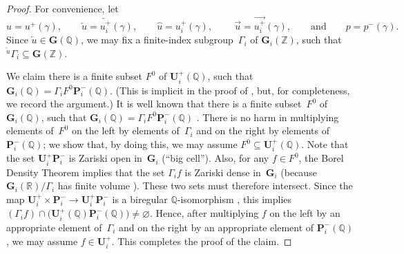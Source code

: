 \documentclass[pdftex]{sigma}
\newcommand{\QQ}{\mathbb{Q}}
\newcommand{\RR}{\mathbb{R}}
\newcommand{\ZZ}{\mathbb{Z}}
\newcommand{\Ga}{\mathbf{G}}
\newcommand{\Pa}{\mathbf{P}}
\newcommand{\Ua}{\mathbf{U}}
\newcommand{\ra}{\overrightarrow}
\newcommand{\la}{\overleftarrow}
\numberwithin{equation}{section}
\theoremstyle{definition}
\begin{document}
\begin{proof}For convenience, let
	\[ u = u^+(\gamma), \qquad \overleftarrow{u} = \la{u^+_i}(\gamma), \qquad \widehat{u} = u^+_i(\gamma), \ \qquad \overrightarrow{u} = \ra{u^+_i}(\gamma), \qquad \text{and}\qquad p = p^-(\gamma) .\]
Since $\overleftarrow{u} \in \Ga(\QQ)$, we may fix a finite-index subgroup~$\Gamma_i$ of $\Ga_i(\ZZ)$, such that ${}^{\overleftarrow{u}}\Gamma_i \subseteq \Ga(\ZZ)$.

We claim there is a finite subset $F^0$ of $\Ua^+_i(\QQ)$, such that $\Ga_i(\QQ) = \Gamma_i F^0 \Pa_i^-(\QQ)$. (This is implicit in the proof of \cite[Lemma~4.19]{MR1828742}, but, for completeness, we record the argument.) It is well known that there is a finite subset~$F^0$ of $\Ga_i(\QQ)$, such that $\Ga_i(\QQ) = \Gamma_i F^0 \Pa_i^-(\QQ)$ \cite[Proposition~15.6]{MR0244260}. There is no harm in multiplying elements of~$F^0$ on the left by elements of~$\Gamma_i$ and on the right by elements of~$\Pa_i^-(\QQ)$; we show that, by doing this, we may assume $F^0 \subseteq \Ua^+_i(\QQ)$.
Note that the set $\Ua^+_i \Pa_i^-$ is Zariski open in~$\Ga_i$ (``big cell'').
Also, for any $f \in F^0$, the Borel Density Theorem \cite[Theorem~4.10, p.~205] {MR1278263} implies that the set $\Gamma_i f$ is Zariski dense in~$\Ga_i$ (because $\Ga_i(\RR)/\Gamma_i$ has finite volume \cite[Theorem~4.13, p.~213]{MR1278263}). These two sets must therefore intersect. Since the map $\Ua^+_i \times \Pa_i^- \to \Ua^+_i \Pa_i^-$ is a biregular $\QQ$-isomorphism \cite[Proposition~3.24, p.~84]{BorelTits-GrpRed}, this implies $(\Gamma_i f) \cap \bigl(\Ua^+_i(\QQ) \Pa_i^-(\QQ) \bigr) \neq \varnothing$. Hence, after multiplying $f$ on the left by an appropriate element of~$\Gamma_i$ and on the right by an appropriate element of $\Pa_i^-(\QQ)$, we may assume $f \in \Ua^+_i$. This completes the proof of the claim.


\end{proof}
\end{document}
